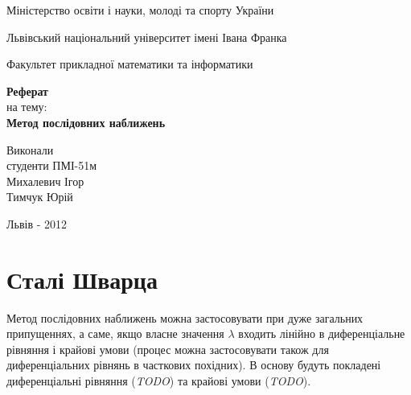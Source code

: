 \documentclass[12pt,a4paper]{article}
\begin{document}

\setlength{\parindent}{1.5cm}
\fontsize{14pt}{6mm}\selectfont

\begin{center}
  Міністерство освіти і науки, молоді та спорту України
  
  Львівський національний університет імені Івана Франка

  Факультет прикладної математики та інформатики
\end{center}


\vspace{6cm}

\begin{center}
  {\bfseries\Large Реферат}\\[0.5cm]
  на тему:\\[0.5cm]
  {\bfseries\Large Метод послідовних наближень}\\
\end{center}

\vspace{2cm}

\begin{flushleft}
  Виконали\\
  студенти ПМІ-51м\\
  Михалевич Ігор\\
  Тимчук Юрій
\end{flushleft}

\vspace{6cm}

\begin{center}
  Львів - 2012 
\end{center}

\clearpage

\fontsize{14pt}{6mm}\selectfont

\section{Сталі Шварца}
Метод послідовних наближень можна застосовувати при дуже загальних припущеннях, а саме, якщо власне значення $\lambda$ входить лінійно в диференціальне рівняння і крайові умови (процес можна застосовувати також для диференціальних рівнянь в часткових похідних). В основу будуть покладені диференціальні рівняння (\emph{TODO}) та крайові умови (\emph{TODO}).
\end{document}
